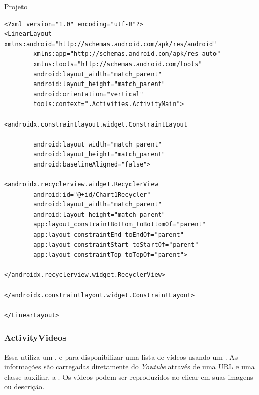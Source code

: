 \documentclass[
	12pt,				%
	openright,			%
	twoside,			%
	a4paper,			%
	english,			%
	french,				%
	spanish,			%
	brazil				%
	]{abntex2}
\begin{document}
\begin{chapter}{Projeto}
\begin{lstlisting}[numbers=none,basicstyle=\small,
caption={FragmentStatistics.xml},
title={FragmentStatistics.xml},
label={FragmentStatistics.xml}]
<?xml version="1.0" encoding="utf-8"?>
<LinearLayout xmlns:android="http://schemas.android.com/apk/res/android"
		xmlns:app="http://schemas.android.com/apk/res-auto"
		xmlns:tools="http://schemas.android.com/tools"
		android:layout_width="match_parent"
		android:layout_height="match_parent"
		android:orientation="vertical"
		tools:context=".Activities.ActivityMain">

<androidx.constraintlayout.widget.ConstraintLayout

		android:layout_width="match_parent"
		android:layout_height="match_parent"
		android:baselineAligned="false">

<androidx.recyclerview.widget.RecyclerView
		android:id="@+id/Chart1Recycler"
		android:layout_width="match_parent"
		android:layout_height="match_parent"
		app:layout_constraintBottom_toBottomOf="parent"
		app:layout_constraintEnd_toEndOf="parent"
		app:layout_constraintStart_toStartOf="parent"
		app:layout_constraintTop_toTopOf="parent">

</androidx.recyclerview.widget.RecyclerView>

</androidx.constraintlayout.widget.ConstraintLayout>

</LinearLayout>
\end{lstlisting}

\subsubsection{ActivityVideos}
Essa  utiliza um ,  e  para disponibilizar uma lista de vídeos usando um . As informações são carregadas diretamente do \textit{Youtube} através de uma URL e uma classe auxiliar, a . Os vídeos podem ser reproduzidos ao clicar em suas imagens ou descrição.

\newpage


\end{chapter}
\end{document}
